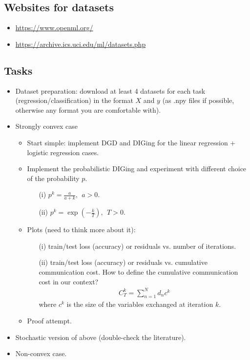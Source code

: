 \documentclass[12pt,draftclsnofoot,onecolumn]{IEEEtran}
\begin{document}
\subsection{Websites for datasets}
\begin{itemize}
\item \url{https://www.openml.org/}
\item \url{https://archive.ics.uci.edu/ml/datasets.php}
\end{itemize}

\subsection{Tasks}
\begin{itemize}
\item Dataset preparation: download at least 4 datasets for each task (regression/classification) in the format $X$ and $y$ (as .npy files if possible, otherwise any format you are comfortable with).
\item Strongly convex case
\begin{itemize}
\item Start simple: implement DGD and DIGing for the linear regression + logistic regression cases.
\item Implement the probabilistic DIGing and experiment with different choice of the probability $p$.
\begin{itemize}
\item[(i)] $p^k = \frac{a}{a + k}, ~~ a > 0$.
\item[(ii)] $p^k = \exp\left(-\frac{k}{T}\right), ~~ T > 0$.
\end{itemize}
\item Plots (need to think more about it): 
\begin{itemize}
\item[(i)] train/test loss (accuracy) or residuals vs. number of iterations.
\item[(ii)] train/test loss (accuracy) or residuals vs. cumulative communication cost. How to define the cumulative communication cost in our context?
\begin{align}
C_T^k = \sum_{n=1}^N d_n c^k
\end{align}
where $c^k$ is the size of the variables exchanged at iteration $k$.
\end{itemize}
\item Proof attempt.
\end{itemize}
\item Stochastic version of above (double-check the literature).
\item Non-convex case.
\end{itemize}

%
%
%
%
%
%

%
%
\end{document}
